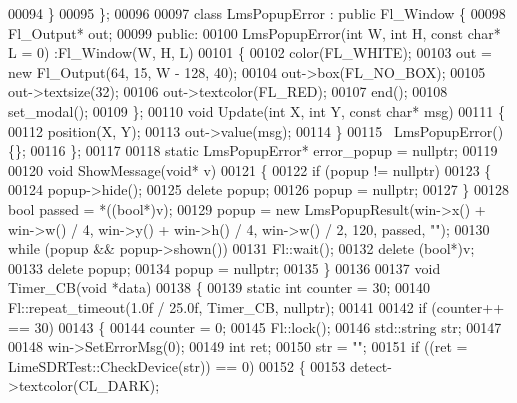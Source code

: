 \begin{DoxyCode}
00094     \}
00095 \};
00096 
00097 \textcolor{keyword}{class }LmsPopupError : \textcolor{keyword}{public} Fl\_Window \{
00098     Fl\_Output* out;
00099 \textcolor{keyword}{public}:
00100     LmsPopupError(\textcolor{keywordtype}{int} W, \textcolor{keywordtype}{int} H, \textcolor{keyword}{const} \textcolor{keywordtype}{char}* L = 0) :Fl\_Window(W, H, L)
00101     \{
00102         color(FL\_WHITE);
00103         out = \textcolor{keyword}{new} Fl\_Output(64, 15, W - 128, 40);
00104         out->box(FL\_NO\_BOX);
00105         out->textsize(32);
00106         out->textcolor(FL\_RED);
00107         end();
00108         set\_modal();
00109     \};
00110     \textcolor{keywordtype}{void} Update(\textcolor{keywordtype}{int} X, \textcolor{keywordtype}{int} Y, \textcolor{keyword}{const} \textcolor{keywordtype}{char}* msg)
00111     \{
00112         position(X, Y);
00113         out->value(msg);
00114     \}
00115     ~LmsPopupError() \{\};
00116 \};
00117 
00118 \textcolor{keyword}{static} LmsPopupError* error\_popup = \textcolor{keyword}{nullptr};
00119 
00120 \textcolor{keywordtype}{void} ShowMessage(\textcolor{keywordtype}{void}* v)
00121 \{
00122     \textcolor{keywordflow}{if} (popup != \textcolor{keyword}{nullptr})
00123     \{
00124         popup->hide();
00125         \textcolor{keyword}{delete} popup;
00126         popup = \textcolor{keyword}{nullptr};
00127     \}
00128     \textcolor{keywordtype}{bool} passed = *((\textcolor{keywordtype}{bool}*)v);
00129     popup = \textcolor{keyword}{new} LmsPopupResult(win->x() + win->w() / 4, win->y() + win->h() / 4, win->w() / 2, 120, passed,
       \textcolor{stringliteral}{""});
00130     \textcolor{keywordflow}{while} (popup && popup->shown())
00131         Fl::wait();
00132     \textcolor{keyword}{delete} (\textcolor{keywordtype}{bool}*)v;
00133     \textcolor{keyword}{delete} popup;
00134     popup = \textcolor{keyword}{nullptr};
00135 \}
00136 
00137 \textcolor{keywordtype}{void} Timer\_CB(\textcolor{keywordtype}{void} *data)
00138 \{
00139     \textcolor{keyword}{static} \textcolor{keywordtype}{int} counter = 30;
00140     Fl::repeat\_timeout(1.0f / 25.0f, Timer\_CB, \textcolor{keyword}{nullptr});
00141 
00142     \textcolor{keywordflow}{if} (counter++ == 30)
00143     \{
00144         counter = 0;
00145         Fl::lock();
00146         std::string str;
00147 
00148         win->SetErrorMsg(0);
00149         \textcolor{keywordtype}{int} ret;
00150         str = \textcolor{stringliteral}{""};
00151         \textcolor{keywordflow}{if} ((ret = LimeSDRTest::CheckDevice(str)) == 0)
00152         \{
00153             detect->textcolor(CL\_DARK);

\end{DoxyCode}
